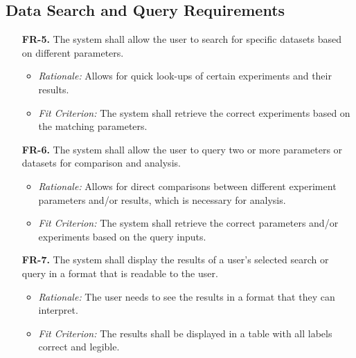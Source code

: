 \documentclass[12pt]{article}
\begin{document}
\subsection{Data Search and Query Requirements}
\begin{enumerate}
  \item[\textbf{FR-5.}] The system shall allow the user to search for specific datasets based on different parameters.
  \begin{itemize}
    \item \textit{Rationale:} Allows for quick look-ups of certain experiments and their results.
    \item \textit{Fit Criterion:} The system shall retrieve the correct experiments based on the matching parameters.
  \end{itemize}
  \item[\textbf{FR-6.}] The system shall allow the user to query two or more parameters or datasets for comparison and analysis.
  \begin{itemize}
    \item \textit{Rationale:} Allows for direct comparisons between different experiment parameters and/or results, which is necessary for analysis.
    \item \textit{Fit Criterion:} The system shall retrieve the correct parameters and/or experiments based on the query inputs.
  \end{itemize}
  \item[\textbf{FR-7.}] The system shall display the results of a user’s selected search or query in a format that is readable to the user.
  \begin{itemize}
    \item \textit{Rationale:} The user needs to see the results in a format that they can interpret.
    \item \textit{Fit Criterion:} The results shall be displayed in a table with all labels correct and legible.
  \end{itemize}
\end{enumerate}
\end{document}
